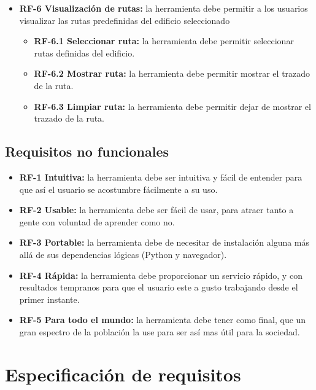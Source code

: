 \begin{itemize}
\begin{itemize}
\end{itemize}
\item
\textbf{RF-6 Visualización de rutas:} la herramienta debe permitir a los usuarios visualizar las rutas predefinidas del edificio seleccionado
\begin{itemize}
	\item
	\textbf{RF-6.1 Seleccionar ruta:} la herramienta debe permitir seleccionar rutas definidas del edificio.
	\item
	\textbf{RF-6.2 Mostrar ruta:} la herramienta debe permitir mostrar el trazado de la ruta.
	\item
	\textbf{RF-6.3 Limpiar ruta:} la herramienta debe permitir dejar de mostrar el trazado de la ruta.
\end{itemize}
\end{itemize}

\subsection{Requisitos no funcionales}

\begin{itemize}
	\item
	\textbf{RF-1 Intuitiva:} la herramienta debe ser intuitiva y fácil de entender para que así el usuario se acostumbre fácilmente a su uso.
	\item
	\textbf{RF-2 Usable:} la herramienta debe ser fácil de usar, para atraer tanto a gente con voluntad de aprender como no.
	\item
	\textbf{RF-3 Portable:} la herramienta debe de necesitar de instalación alguna más allá de sus dependencias lógicas (Python y navegador).
	\item
	\textbf{RF-4 Rápida:} la herramienta debe proporcionar un servicio rápido, y con resultados tempranos para que el usuario este a gusto trabajando desde el primer instante.
	\item
	\textbf{RF-5 Para todo el mundo:} la herramienta debe tener como final, que un gran espectro de la población la use para ser así mas útil para la sociedad.
\end{itemize}

\section{Especificación de requisitos}




